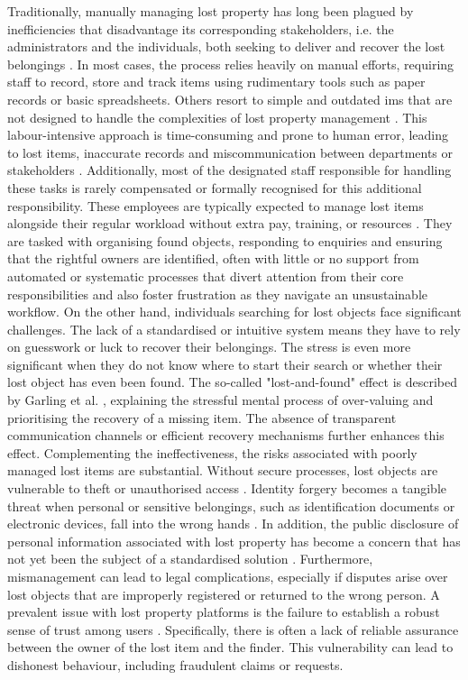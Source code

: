 Traditionally, manually managing lost property has long been plagued by inefficiencies that disadvantage its corresponding stakeholders, i.e. the administrators and the individuals, both seeking to deliver and recover the lost belongings \cite{Sinha2024}.
In most cases, the process relies heavily on manual efforts, requiring staff to record, store and track items using rudimentary tools such as paper records or basic spreadsheets.
Others resort to simple and outdated \ac{ims} that are not designed to handle the complexities of lost property management \cite{Guinard2008}.
This labour-intensive approach is time-consuming and prone to human error, leading to lost items, inaccurate records and miscommunication between departments or stakeholders \cite{Sinha2024, Guinard2008}.
Additionally, most of the designated staff responsible for handling these tasks is rarely compensated or formally recognised for this additional responsibility.
These employees are typically expected to manage lost items alongside their regular workload without extra pay, training, or resources \cite{Guinard2008}.
They are tasked with organising found objects, responding to enquiries and ensuring that the rightful owners are identified, often with little or no support from automated or systematic processes that divert attention from their core responsibilities and also foster frustration as they navigate an unsustainable workflow.
On the other hand, individuals searching for lost objects face significant challenges.
The lack of a standardised or intuitive system means they have to rely on guesswork or luck to recover their belongings.
The stress is even more significant when they do not know where to start their search or whether their lost object has even been found.
The so-called "lost-and-found" effect is described by Garling et al. \cite{Garling2023}, explaining the stressful mental process of over-valuing and prioritising the recovery of a missing item.
The absence of transparent communication channels \cite{Guinard2008} or efficient recovery mechanisms further enhances this effect.
Complementing the ineffectiveness, the risks associated with poorly managed lost items are substantial.
Without secure processes, lost objects are vulnerable to theft or unauthorised access \cite{Tan2023}.
Identity forgery becomes a tangible threat when personal or sensitive belongings, such as identification documents or electronic devices, fall into the wrong hands \cite{Xue2022}.
In addition, the public disclosure of personal information associated with lost property has become a concern that has not yet been the subject of a standardised solution \cite{Xue2022}.
Furthermore, mismanagement can lead to legal complications, especially if disputes arise over lost objects that are improperly registered or returned to the wrong person.
A prevalent issue with lost property platforms is the failure to establish a robust sense of trust among users \cite{Xue2022}.
Specifically, there is often a lack of reliable assurance between the owner of the lost item and the finder.
This vulnerability can lead to dishonest behaviour, including fraudulent claims or requests.

